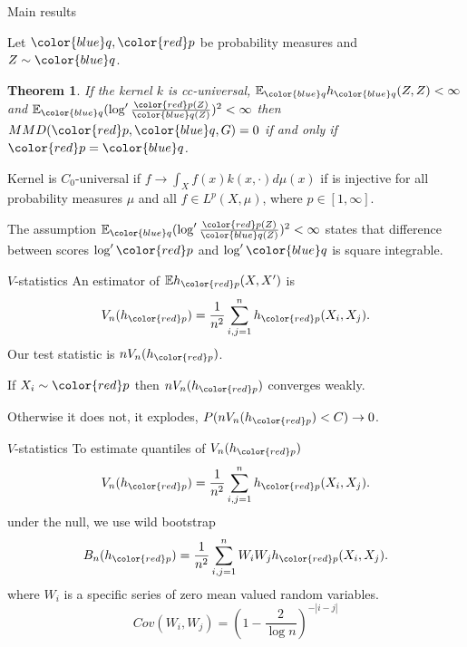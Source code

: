 \documentclass{beamer}
\newtheorem{thm}{Theorem}
\begin{document}
\begin{frame}{Main results}

Let ${ \color{blue} q},{\color{red} p}$ be probability measures and $Z\sim { \color{blue} q}$. 
\begin{thm}
 If the kernel $k$ is cc-universal, $\ev_{{ \color{blue} q}} h_{{ \color{blue} q}}(Z,Z)<\infty$ and $\ev_{{ \color{blue} q}} (\log' \frac{{\color{red} p}(Z)}{{ \color{blue} q}(Z)})^{2}<\infty$
then $MMD({\color{red} p},{ \color{blue} q},G) =0$ if and only if ${\color{red} p}={ \color{blue} q}$.
\end{thm}

\vspace{10mm}
\footnotesize{
Kernel is $C_0$-universal if  $f \to \int_X f(x) k(x,\cdot) d\mu(x)$ if is injective for all probability measures $\mu$ and all  $f \in L^p(X,\mu)$, where  $p \in [1,\infty] $. 

The assumption $\ev_{{ \color{blue} q}} (\log' \frac{{\color{red} p}(Z)}{{ \color{blue} q}(Z)})^{2}<\infty$ states that difference between scores $\log' \color{red} p$ and $\log' \color{blue} q$  is square integrable. 
}

\end{frame} 


 
 \begin{frame}{$V$-statistics}
An estimator of $\ev h_{\color{red} p}(X,X')$ is
\[
 V_n(h_{\color{red} p}) = \frac {1} {n^2} \sum_{i,j=1}^n h_{\color{red} p}(X_i,X_j).
\]
Our test statistic is $ n V_n(h_{\color{red} p})$.

If $X_i \sim {\color{red} p}$ then $ n V_n(h_{\color{red} p})$  converges weakly. 

Otherwise it does not,  it explodes, $P(n V_n(h_{\color{red} p}) <C) \to 0$.
 \end{frame}
 
 
  \begin{frame}{$V$-statistics}
To estimate quantiles of $ V_n(h_{\color{red} p})$  
\[
 V_n(h_{\color{red} p}) = \frac {1} {n^2} \sum_{i,j=1}^n h_{\color{red} p}(X_i,X_j).
\]
under the null, we use wild bootstrap
\[
 B_n(h_{\color{red} p}) = \frac {1} {n^2} \sum_{i,j=1}^n W_i W_j h_{\color{red} p}(X_i,X_j).
\]
  where $W_i$ is a specific series of zero mean valued random variables.
  $$
  Cov(W_i,W_j) = (1-\frac{2}{\log n})^{-|i-j|}
  $$
\end{frame}
\end{document}
